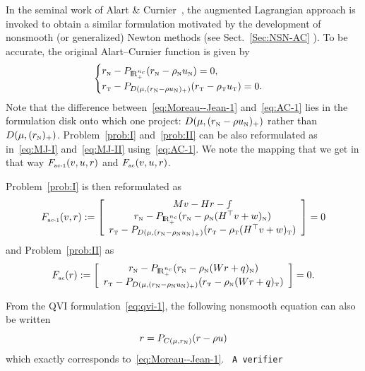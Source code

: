  In the seminal work of  Alart \& Curnier~\cite{Curnier.Alart88,Alart.Curnier1991}, the augmented Lagrangian approach is invoked to obtain a  similar formulation motivated by the development of nonsmooth (or generalized) Newton methods (see Sect.~\ref{Sec:NSN-AC} ). To be accurate, the original Alart--Curnier function is given by 
\begin{equation}
  \label{eq:AC-1}
  \begin{cases}
    r_\n - P_{\RR^{n_c}_+}(r_\n - \rho_\n  u_\n) = 0, \\
    r_\t - P_{D(\mu, (r_\n - \rho u_\n)_+)}(r_\t - \rho_\t u_\t   )=0.
  \end{cases}
\end{equation}
Note that the difference between~\eqref{eq:Moreau--Jean-1} and~\eqref{eq:AC-1} lies in the formulation disk onto which one project: $D(\mu, (r_{\hbox{\tiny{N}}} - \rho u_{\hbox{\tiny{N}}})_+)$ rather than $D(\mu, (r_{{\hbox{\tiny{N}}}})_+)$. Problem~\ref{prob:I} and~\ref{prob:II} can be also reformulated as in~\eqref{eq:MJ-I} and~\eqref{eq:MJ-II} using~\eqref{eq:AC-1}. We note the mapping that we get in that way $F_{{\hbox{\tiny{ac-1}}}}(v,u,r)$ and  $F_{{\hbox{\tiny{ac}}}}(v,u,r)$.


Problem~\ref{prob:I} is then reformulated as
\begin{equation}
  \label{eq:AC-I}
  F_{\acone}(v,r) := \left[
    \begin{array}{c}
    Mv - Hr - f \\
    r_\n - P_{\RR^{n_c}_+}(r_\n - \rho_\n (H^\top v +w)_\n) \\
    r_\t - P_{D(\mu, (r_\n - \rho_\n u_\n)_+)}(r_\t - \rho_\t (H^\top v +w)_\t   )
  \end{array}\right] =0
\end{equation}
and  Problem~\ref{prob:II}  as
\begin{equation}
  \label{eq:AC-II}
    F_{\actwo}(r) := \left[ \begin{array}{c}
    r_\n - P_{\RR^{n_c}_+}(r_\n - \rho_\n (W r +  q)_\n) \\
    r_\t - P_{D(\mu, (r_\n - \rho_\n u_\n)_+)}(r_\t - \rho_\n (W r +  q)_\t   )
  \end{array}\right] =0.
\end{equation}

\begin{remark}
  From the QVI formulation~\eqref{eq:qvi-1}, the following nonsmooth
  equation can also be written
  \begin{equation}
    \label{eq:qvi-proj}
    r = P_{C(\mu,r_\n)}(r-\rho u)
  \end{equation}
  which exactly corresponds to~\eqref{eq:Moreau--Jean-1}. \texttt{ A verifier}
\end{remark}

